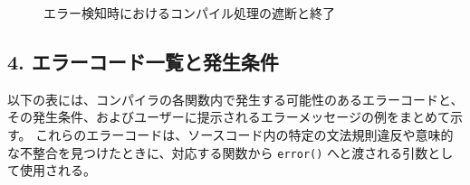 \documentclass[11pt,a4paper,dvipdfmx]{bxjsarticle}
\begin{document}
\begin{figure}[!ht]
\begin{center}
\caption{エラー検知時におけるコンパイル処理の遮断と終了}
\label{fig:error_handling_flow}
\end{center}
\end{figure}

\newpage
\subsection*{4. エラーコード一覧と発生条件}
以下の表には、コンパイラの各関数内で発生する可能性のあるエラーコードと、その発生条件、およびユーザーに提示されるエラーメッセージの例をまとめて示す。
これらのエラーコードは、ソースコード内の特定の文法規則違反や意味的な不整合を見つけたときに、対応する関数から \texttt{error()} へと渡される引数として使用される。
\end{document}
